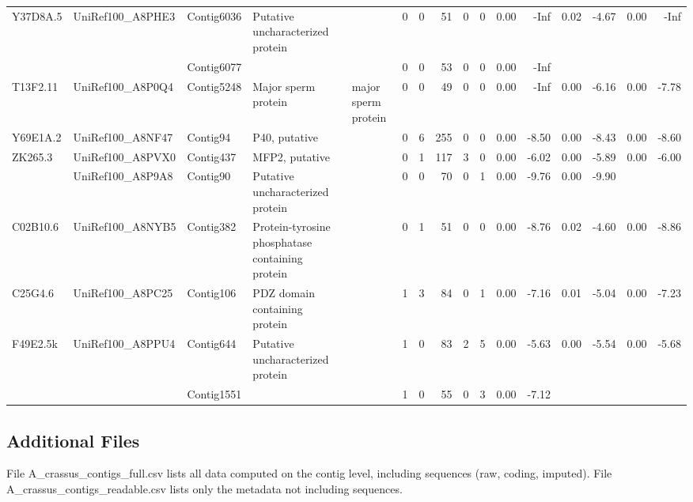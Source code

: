 \documentclass[10pt]{bmc_article}
\newenvironment{bmcformat}{\begin{raggedright}\baselineskip20pt\sloppy\setboolean{publ}{false}}{\end{raggedright}\baselineskip20pt\sloppy}
\begin{document}
\begin{bmcformat}
\begin{sidewaystable}[ht]
\begin{center}
\begin{tabular}{lllp{2cm}p{2cm}rrrrrrrrrrr}
  Y37D8A.5 & UniRef100\_A8PHE3 & Contig6036 & Putative uncharacterized protein &  &   0 &   0 &  51 &   0 &   0 & 0.00 & -Inf & 0.02 & -4.67 & 0.00 & -Inf \\ 
   &  & Contig6077 &  &  &   0 &   0 &  53 &   0 &   0 & 0.00 & -Inf &  &  &  &  \\ 
  T13F2.11 & UniRef100\_A8P0Q4 & Contig5248 & Major sperm protein & major sperm protein &   0 &   0 &  49 &   0 &   0 & 0.00 & -Inf & 0.00 & -6.16 & 0.00 & -7.78 \\ 
  Y69E1A.2 & UniRef100\_A8NF47 & Contig94 & P40, putative &  &   0 &   6 & 255 &   0 &   0 & 0.00 & -8.50 & 0.00 & -8.43 & 0.00 & -8.60 \\ 
  ZK265.3 & UniRef100\_A8PVX0 & Contig437 & MFP2, putative &  &   0 &   1 & 117 &   3 &   0 & 0.00 & -6.02 & 0.00 & -5.89 & 0.00 & -6.00 \\ 
   & UniRef100\_A8P9A8 & Contig90 & Putative uncharacterized protein &  &   0 &   0 &  70 &   0 &   1 & 0.00 & -9.76 & 0.00 & -9.90 &  &  \\ 
  C02B10.6 & UniRef100\_A8NYB5 & Contig382 & Protein-tyrosine phosphatase containing protein &  &   0 &   1 &  51 &   0 &   0 & 0.00 & -8.76 & 0.02 & -4.60 & 0.00 & -8.86 \\ 
  C25G4.6 & UniRef100\_A8PC25 & Contig106 & PDZ domain containing protein &  &   1 &   3 &  84 &   0 &   1 & 0.00 & -7.16 & 0.01 & -5.04 & 0.00 & -7.23 \\ 
  F49E2.5k & UniRef100\_A8PPU4 & Contig644 & Putative uncharacterized protein &  &   1 &   0 &  83 &   2 &   5 & 0.00 & -5.63 & 0.00 & -5.54 & 0.00 & -5.68 \\ 
   &  & Contig1551 &  &  &   1 &   0 &  55 &   0 &   3 & 0.00 & -7.12 &  &  &  &  \\ 
   \hline
\end{tabular}
\end{center}
\end{sidewaystable}
\normalsize




\subsection*{Additional Files}

File A\_crassus\_contigs\_full.csv lists all data computed on the contig
level, including sequences (raw, coding, imputed). File
A\_crassus\_contigs\_readable.csv lists only the metadata not including
sequences.

\end{bmcformat}
\end{document}
